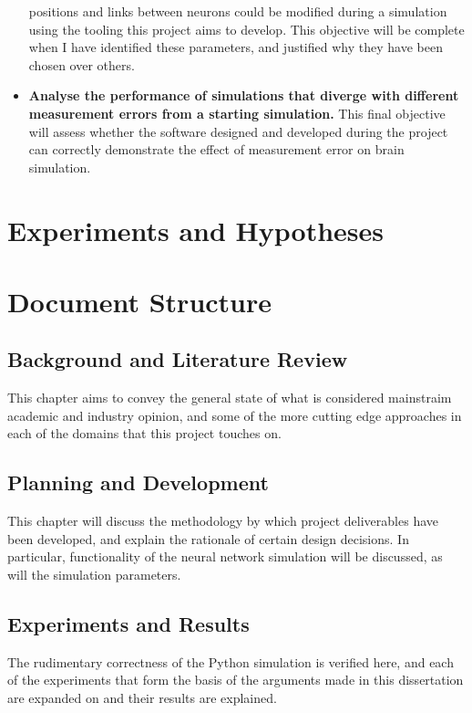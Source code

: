 \begin{itemize}
          positions and links between neurons could be modified during a
          simulation using the tooling this project aims to develop. This
          objective will be complete when I have identified these
          parameters, and justified why they have been chosen over others.
    \item \textbf{Analyse the performance of simulations that diverge with
              different measurement errors from a starting simulation.} This
          final objective will assess whether the software designed and
          developed during the project can correctly demonstrate the effect
          of measurement error on brain simulation. 
\end{itemize}

\section{Experiments and Hypotheses}



\section{Document Structure}

\subsection*{Background and Literature Review}
This chapter aims to convey the general state of what is considered mainstraim
academic and industry opinion, and some of the more cutting edge approaches in
each of the domains that this project touches on.

\subsection*{Planning and Development}
This chapter will discuss the methodology by which project deliverables have
been developed, and explain the rationale of certain design decisions. In
particular, functionality of the neural network simulation will be
discussed, as will the simulation parameters.

\subsection*{Experiments and Results}
The rudimentary correctness of the Python simulation is verified here, and each
of the experiments that form the basis of the arguments made in this
dissertation are expanded on and their results are explained. 

